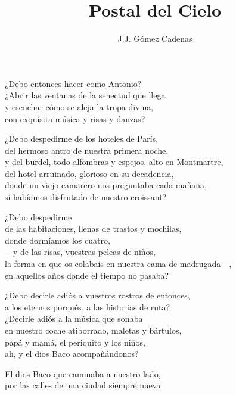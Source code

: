 \documentclass[12pt,twoside]{article}
\title{Postal del Cielo}
\author{J.J. Gómez Cadenas}
\begin{document}
\maketitle

\begin{poem}
\begin{stanza}
¿Debo entonces hacer como Antonio?\\
¿Abrir las ventanas de la senectud que llega\\
y escuchar cómo se aleja la tropa divina,\\
con exquisita música y risas y danzas?
\end{stanza}
\begin{stanza}
¿Debo despedirme de los hoteles de París,\\
del hermoso antro de nuestra primera noche,\\
y del burdel, todo alfombras y espejos, alto en Montmartre,\\
del hotel arruinado, glorioso en su decadencia,\\
donde un viejo camarero nos preguntaba cada mañana,\\
si habíamos disfrutado de nuestro croissant?
\end{stanza}
\begin{stanza}
¿Debo despedirme\\
de las habitaciones, llenas de trastos y mochilas,\\
donde dormíamos los cuatro,\\
---y de las risas, vuestras peleas de niños,\\
la forma en que os colabais en nuestra cama de madrugada---,\\
en aquellos años donde el tiempo no pasaba?
\end{stanza}
\begin{stanza}
¿Debo decirle adiós a vuestros rostros de entonces,\\
a los eternos porqués, a las historias de ruta?\\
¿Decirle adiós a la música que sonaba\\
en nuestro coche atiborrado, maletas y bártulos,\\
papá y mamá, el periquito y los niños,\\
ah, y el dios Baco acompañándonos?
\end{stanza}
\begin{stanza}
El dios Baco que caminaba a nuestro lado,\\
por las calles de una ciudad siempre nueva.

\end{stanza}
\end{poem}
\end{document}
